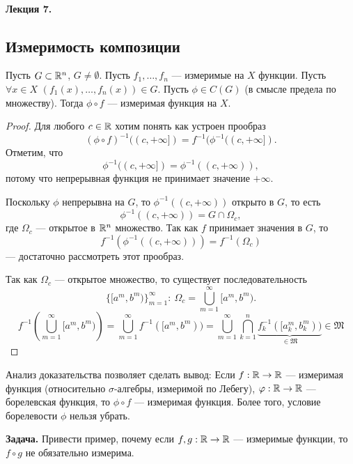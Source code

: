 \paragraph{Лекция 7.}

\subsection{Измеримость композиции}
\begin{theorem}
    Пусть $G \subset \mathbb{R}^n$, $G \neq \emptyset$.
    Пусть $f_1, \dots, f_n$ — измеримые на $X$ функции.
    Пусть $\forall x \in X$ $(f_1(x), \dots, f_n(x)) \in G$.
    Пусть $\phi \in C(G)$ (в смысле предела по множеству).
    Тогда $\phi \circ f$ — измеримая функция на $X$.
\end{theorem} 
\begin{proof}
    Для любого $c \in \mathbb{R}$ хотим понять как устроен прообраз
    \[(\phi \circ f)^{-1}((c,+\infty]) = f^{-1}(\phi^{-1}((c, +\infty]).\]
    Отметим, что
    \[\phi^{-1}((c, +\infty]) = \phi^{-1}((c, +\infty)),\]
    потому что непрерывная функция не принимает значение $+\infty$.

    \noindent Поскольку $\phi$ непрерывна на $G$, то $\phi^{-1}((c, +\infty))$ открыто в $G$, то есть
    \[\phi^{-1}((c, +\infty)) = G \cap \Omega_c,\]
    где $\Omega_c$ — открытое в $\mathbb{R}^n$ множество.
    Так как $f$ принимает значения в $G$, то 
    $$f^{-1}(\phi^{-1}((c, +\infty))) = f^{-1}(\Omega_c)$$
    — достаточно рассмотреть этот прообраз.
    
    Так как $\Omega_c$ — открытое множество, то существует последовательность
    \[\{[a^m, b^m)\}_{m=1}^\infty: \ \Omega_c = \bigcup\limits_{m=1}^{\infty}[a^m, b^m).\]
    \[
        f^{-1}\left(\bigcup\limits_{m=1}^{\infty}[a^m, b^m)\right)
        =
        \bigcup\limits_{m=1}^{\infty} f^{-1}([a^m, b^m))
        =
        \bigcup\limits_{m=1}^{\infty} \bigcap\limits_{k=1}^{n} \underbrace{f_k^{-1} ([a_k^m, b_k^m))}_{\in \mathfrak{M}} \in \mathfrak{M}
    \]
\end{proof} 

\begin{remark}
    Анализ доказательства позволяет сделать вывод:
    Если $f: \mathbb{R} \to \mathbb{R}$ — измеримая функция (относительно $\sigma$-алгебры, измеримой по Лебегу),
    $\varphi: \mathbb{R} \to \mathbb{R}$ — борелевская функция, то
    $\phi \circ f$ — измеримая функция.
    Более того, условие борелевости $\phi$ нельзя убрать.
\end{remark}
\noindent \textbf{Задача.} Привести пример, почему если
$f,g: \mathbb{R} \to \mathbb{R}$ — измеримые функции, то $f \circ g$ не обязательно измерима.


